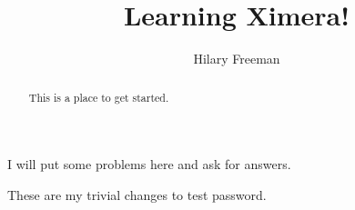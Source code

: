 \documentclass[handout]{ximera}
\title{Learning Ximera!}
\author{Hilary Freeman}
\begin{document}
\begin{abstract}
  This is a place to get started.
\end{abstract}
\maketitle

I will put some problems here and ask for answers.



These are my trivial changes to test password.

\end{document}
